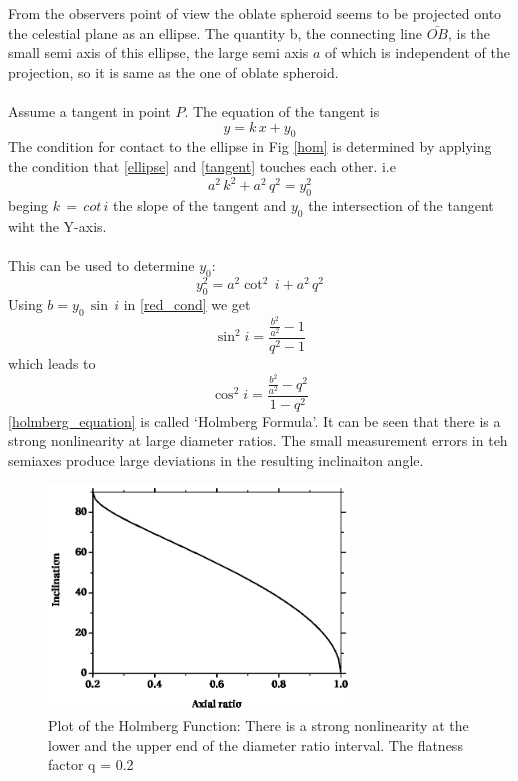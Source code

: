 From the observers point of view the oblate spheroid seems to be projected onto the celestial plane as an ellipse. The quantity b, the connecting line $\bar{OB}$, is the small semi axis of this ellipse, the large semi axis $a$ of which is independent of the projection, so it is same as the one of oblate spheroid.\\\\
Assume a tangent in point $P$. The equation of the tangent is \begin{equation}\label{tangent}y=k\,x + y_0\end{equation}The condition for contact to the ellipse in Fig \ref{hom} is determined by applying the condition that \eqref{ellipse} and \eqref{tangent} touches each other. i.e 
\begin{equation}
a^2\,k^2 + a^2\,q^2 = y_0^2
\end{equation}
beging $k\,=\,cot\,i$ the slope of the tangent and $y_0$ the intersection of the tangent wiht the Y-axis.\\\\
This can be used to determine $y_0:$
\begin{equation}\label{red_cond}
y_0^2 = a^2 \cot^2\,i + a^2\,q^2
\end{equation} 
Using $b=y_0\,\sin\,i$ in \eqref{red_cond} we get
\begin{equation}
\sin^2 i=\frac{\frac{b^2}{a^2}-1}{q^2-1}
\end{equation}
which leads to
\begin{equation}\label{holmberg_equation}
\cos^2 i=\frac{\frac{b^2}{a^2}-q^2}{1-q^2}
\end{equation}
\eqref{holmberg_equation} is called \textquoteleft Holmberg Formula\textquoteright. It can be seen that there is a strong nonlinearity at large diameter ratios. The small measurement errors in teh semiaxes produce large deviations in the resulting inclinaiton angle.
\begin{figure}[H]
\begin{center}
\includegraphics[height=6cm]{holmberg.eps}
\end{center}
\caption{Plot of the Holmberg Function: There is a strong nonlinearity at the lower
and the upper end of the diameter ratio interval. The flatness factor q = 0.2}
\end{figure}